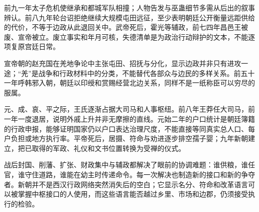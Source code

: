 前九一年太子危机使继承和都城军队相撞；人物告发与巫蛊细节多需从后出的叙事辨认。前八九年轮台诏拒绝继续大规模屯田远征，至少表明朝廷公开衡量远距供给的代价，不等于边政从此退回关中。武帝死后，霍光等辅政，前七四年昌邑王被废、宣帝被立。废立事实和年月可核，失德清单是为政治行动辩护的文本，不能逐项复原宫廷日常。

宣帝朝的赵充国在羌地争论中主张屯田、招抚与分化，显示边政并非只有进攻一途；“羌”是战争和行政材料中的分类，不能替代各部众与边民的多样关系。前五十一年呼韩邪入朝，朝廷以印绶和赏赐经营北边关系，同样不是一纸称臣可以穷尽的服属。

元、成、哀、平之际，王氏逐渐占据大司马和人事枢纽。前八年王莽任大司马，前一年一度退居，说明外戚上升并非无摩擦的直线。元始二年的户口统计是朝廷簿籍的行政申报，能够证明国家仍以户口表达治理尺度，不能直接等同真实总人口、每户负担或地方执行率。平帝死后，居摄、符命与劝进逐步排空孺子婴；九年新朝建立，把已取得的军政、礼仪和文书位置转换为受禅的仪式。

\begin{turningpoint}[前二〇六年至九年留下的压力]
战后封国、削藩、扩张、财政集中与辅政都解决了眼前的协调难题：谁供粮，谁任官，谁守住道路，谁能在幼主时传递命令。每一次解决也制造新的接口和新的争夺者。新朝并不是西汉行政网络突然消失后的空白；它显示名分、符命和改革语言可以被掌握中枢接口的人使用，而这些语言能否越过乡里、市场和边郡，仍须接受执行的检验。
\end{turningpoint}
